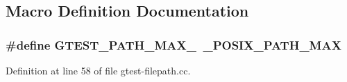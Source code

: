 \subsection{Macro Definition Documentation}
\subsubsection[{\texorpdfstring{G\+T\+E\+S\+T\+\_\+\+P\+A\+T\+H\+\_\+\+M\+A\+X\+\_\+}{GTEST_PATH_MAX_}}]{\setlength{\rightskip}{0pt plus 5cm}\#define G\+T\+E\+S\+T\+\_\+\+P\+A\+T\+H\+\_\+\+M\+A\+X\+\_\+~\+\_\+\+P\+O\+S\+I\+X\+\_\+\+P\+A\+T\+H\+\_\+\+M\+AX}\hypertarget{gtest-filepath_8cc_ad9d445747785a9271a57cf1d392b89ad}{}\label{gtest-filepath_8cc_ad9d445747785a9271a57cf1d392b89ad}


Definition at line 58 of file gtest-\/filepath.\+cc.

